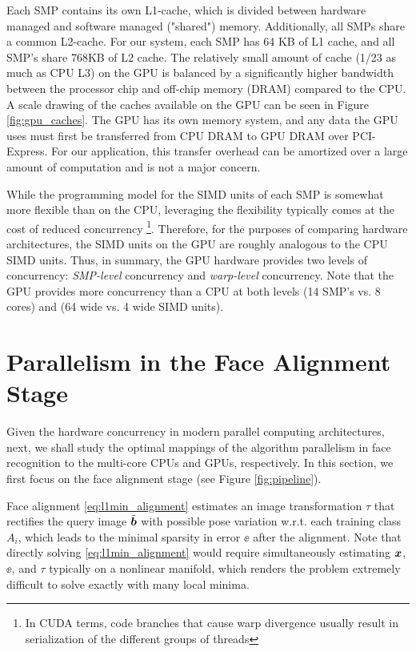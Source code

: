 \documentclass[10pt,twocolumn,letterpaper]{article}
\begin{document}
Each SMP contains its own L1-cache, which is divided between hardware managed
and software managed ("shared") memory.  Additionally, all SMPs share a common
L2-cache.  For our system, each SMP has 64 KB of L1 cache, and all SMP's share
768KB of L2 cache. 
The relatively small amount
of cache (1/23 as much as CPU L3) on the GPU is balanced by a significantly
higher bandwidth between the processor chip and off-chip memory (DRAM) compared
to the CPU.  A scale drawing of the caches available on the GPU can be seen in Figure \ref{fig:gpu_caches}.
The GPU has its own memory system, and any data the GPU uses must first be
transferred from CPU DRAM to GPU DRAM over PCI-Express.  For our application,
this transfer overhead can be amortized over a large amount of computation and is
not a major concern.

While the programming model for
the SIMD units of each SMP is somewhat more flexible than on the CPU,
leveraging the flexibility typically comes at the cost of reduced concurrency
\footnote{In CUDA terms, code branches that cause warp divergence usually
result in serialization of the different groups of threads}.  Therefore, for
the purposes of comparing hardware architectures, the SIMD units on the GPU are
roughly analogous to the CPU SIMD units. Thus, in summary, the GPU hardware 
provides two levels of concurrency: {\em SMP-level}
concurrency and {\em warp-level} concurrency.  Note that the GPU provides more
concurrency than a CPU at both levels (14 SMP's vs. 8 cores) and (64 wide vs. 4 wide SIMD
units).

\section{Parallelism in the Face Alignment Stage}
\label{sec:alignment}

Given the hardware concurrency in modern parallel computing architectures, next,
we shall study the optimal mappings of the algorithm parallelism in face recognition to the multi-core CPUs and GPUs, respectively.
In this section, we first focus on the face alignment stage (see Figure \ref{fig:pipeline}).

Face alignment \eqref{eq:l1min_alignment} estimates an image transformation $\tau$ that rectifies the query image $\tilde{{\boldsymbol{b}}}$ with possible pose variation
w.r.t. each training class $A_i$, which leads to the minimal sparsity in error $\ee$ after the alignment. Note that directly solving \eqref{eq:l1min_alignment} would require
simultaneously estimating ${\boldsymbol{x}}$, $\ee$, and $\tau$ typically on a nonlinear manifold, which renders the problem extremely difficult to solve exactly with many local minima.
\end{document}
